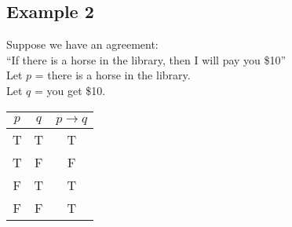 \documentclass[letterpaper, 12pt]{math}
\begin{document}
\subsection*{Example 2}
Suppose we have an agreement: \\
``If there is a horse in the library, then I will pay you \$10'' \\
Let \( p \) = there is a horse in the library. \\
Let \( q \) = you get \$10.
\begin{center}
  \begin{tabular}{|c|c|c|}
    \hline
    \( p \) & \( q \) & \( p \to q \) \\ \hline
    T       & T       & T \\ \hline
    T       & F       & F \\ \hline
    F       & T       & T \\ \hline
    F       & F       & T \\ \hline
  \end{tabular}
\end{center}
\end{document}
